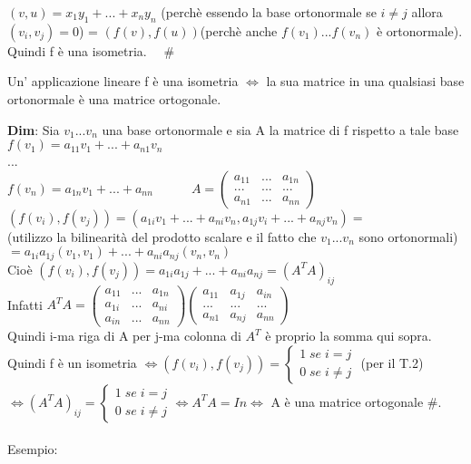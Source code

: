 \documentclass[12pt]{article}
\begin{document}
$(v,u) = x_1y_1+...+x_ny_n$ (perchè essendo la base ortonormale se $i\neq j$
allora$(v_i, v_j ) = 0$) = $(f(v), f(u))$(perchè anche $f(v_1)...f(v_n)$ è ortonormale).
Quindi f è una isometria. $\quad \#$\\
\begin{theorem}[T.3]
Un' applicazione lineare f è una isometria $\iff$ la sua matrice in una qualsiasi base ortonormale è una matrice ortogonale.
\end{theorem}
\textbf{Dim}: Sia $v_1...v_n$ una base ortonormale e sia A la matrice di f rispetto a tale base\\
$f(v_1) = a_{11}v_1+...+a_{n1}v_n$\\
...\\
$f(v_n) = a_{1n}v_1+...+a_{nn}\quad \quad \quad A = \begin{pmatrix}
    a_{11} & ... & a_{1n}\\
    ... & ... & ...\\
    a_{n1} & ... & a_{nn}
\end{pmatrix}$\\
$(f(v_i),f(v_j)) = (a_{1i}v_1+...+a_{ni}v_n, a_{1j}v_i+...+a_{nj}v_n)=$\\
(utilizzo la bilinearità del prodotto scalare e il fatto che $v_1...v_n$ sono ortonormali)\\
$= a_{1i}a_{1j}(v_1,v_1)+...+a_{ni}a_{nj}(v_n,v_n)$\\
Cioè $(f(v_i), f(v_j)) = a_{1i}a_{1j}+...+a_{ni}a_{nj} = (A^TA)_{ij}$\\
Infatti $A^TA = \begin{pmatrix}
    a_{11} & ... & a_{1n}\\
    a_{1i} & ... & a_{ni}\\
    a_{in} & ... & a_{nn}
\end{pmatrix}\begin{pmatrix}
    a_{11} & a_{1j} & a_{in}\\
    ... & ... & ...\\
    a_{n1} & a_{nj} & a_{nn}
\end{pmatrix}$\\
Quindi i-ma riga di A per j-ma colonna di $A^T$ è proprio la somma qui sopra.\\
Quindi f è un isometria $\iff (f(v_i),f(v_j)) = \begin{cases}
    1 \;se\; i = j\\
    0 \;se\; i\neq j
\end{cases}$ (per il T.2) $\iff (A^TA)_{ij} = \begin{cases}
    1\;se\; i=j\\
    0\;se\; i\neq j
\end{cases} \iff A^TA = In \iff $ A è una matrice ortogonale $\#$.\\\\
Esempio:\\\\\\\\\
\end{document}
